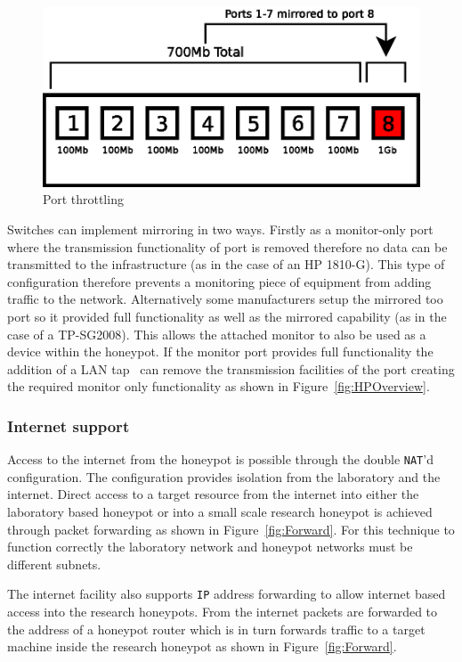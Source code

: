 \begin{figure}[h]
\begin{center}
	\includegraphics[scale=0.4]{Images/Throttle.eps}
\caption{Port throttling}
\label{fig:throttling}
\end{center}
\end{figure}

Switches can implement mirroring in two ways. Firstly as a monitor-only port where the transmission functionality of port is removed therefore no data can be transmitted to the infrastructure (as in the case of an HP 1810-G). This type of configuration therefore prevents a monitoring piece of equipment from adding traffic to the network. Alternatively some manufacturers setup the mirrored too port so it provided full functionality as well as the mirrored capability (as in the case of a TP-SG2008). This allows the attached monitor to also be used as a device within the honeypot. If the monitor port provides full functionality the addition of a LAN tap~\cite{RB:13} can remove the transmission facilities of the port creating the required monitor only functionality as shown in Figure~\ref{fig:HPOverview}.

\subsubsection{Internet support}
Access to the internet from the honeypot is possible through the double \texttt{NAT}'d configuration. The configuration provides isolation from the laboratory and the internet. Direct access to a target resource from the internet into either the laboratory based honeypot or into a small scale research honeypot is achieved through packet forwarding as shown in Figure~\ref{fig:Forward}. For this technique to function correctly the laboratory network and honeypot networks must be different subnets.

The internet facility also supports \texttt{IP} address forwarding to allow internet based access into the research honeypots. From the internet packets are forwarded to the address of a honeypot router which is in turn forwards traffic to a target machine inside the research honeypot as shown in Figure~\ref{fig:Forward}. 

